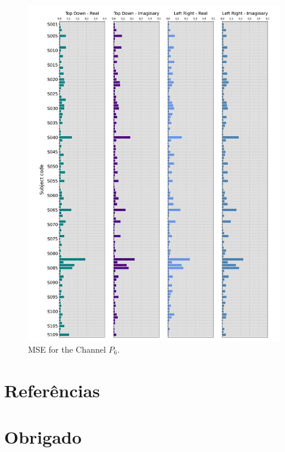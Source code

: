 \documentclass[11pt, aspectratio=169]{beamer}
\begin{document}
\begin{frame}
\begin{figure}[ht]
\begin{minipage}[b]{0.21\linewidth}
      \includegraphics[height=.5\paperheight]{../Figures/art_02/Fig13.jpg}
      \caption{MSE for the Channel $P_{6}$.}
      \label{fig24}
    \end{minipage}

  \end{figure}
\end{frame}

\section{Referências}

\begin{frame}[allowframebreaks]

  

\end{frame}

\section*{Obrigado}
\end{document}
